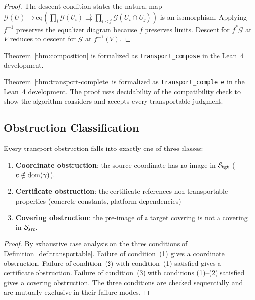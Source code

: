 \documentclass[11pt]{article}
\newcommand{\SourceSite}{\Site_{\mathrm{src}}}
\newcommand{\TargetSite}{\Site_{\mathrm{tgt}}}
\newcommand{\CompMap}{\gamma}
\begin{document}
\begin{proof}
The descent condition states the natural map
$\mathcal{G}(U) \to \mathrm{eq}(\prod_i \mathcal{G}(U_i)
\rightrightarrows \prod_{i<j} \mathcal{G}(U_i \cap U_j))$
is an isomorphism.  Applying $f^{-1}$ preserves the equalizer diagram
because $f$ preserves limits.  Descent for $f^{*}\mathcal{G}$ at $V$
reduces to descent for $\mathcal{G}$ at $f^{-1}(V)$.
\end{proof}

\begin{lemma}\label{lem:comp-formal}
Theorem~\ref{thm:composition} is formalized as
\texttt{transport\_compose} in the Lean~4 development.
\end{lemma}

\begin{lemma}\label{lem:complete-formal}
Theorem~\ref{thm:transport-complete} is formalized as
\texttt{transport\_complete} in the Lean~4 development.  The proof
uses decidability of the compatibility check to show the algorithm
considers and accepts every transportable judgment.
\end{lemma}

\subsection{Obstruction Classification}

\begin{theorem}\label{thm:obstr-trichotomy}
Every transport obstruction falls into exactly one of three classes:
\begin{enumerate}[noitemsep]
  \item \textbf{Coordinate obstruction}: the source coordinate has no
        image in $\TargetSite$ ($\coord \notin \mathrm{dom}(\CompMap)$).
  \item \textbf{Certificate obstruction}: the certificate references
        non-transportable properties (concrete constants, platform
        dependencies).
  \item \textbf{Covering obstruction}: the pre-image of a target
        covering is not a covering in $\SourceSite$.
\end{enumerate}
\end{theorem}

\begin{proof}
By exhaustive case analysis on the three conditions of
Definition~\ref{def:transportable}.  Failure of condition~(1) gives
a coordinate obstruction.  Failure of condition~(2) with condition~(1)
satisfied gives a certificate obstruction.  Failure of condition~(3)
with conditions (1)--(2) satisfied gives a covering obstruction.
The three conditions are checked sequentially and are mutually
exclusive in their failure modes.
\end{proof}
\end{document}
